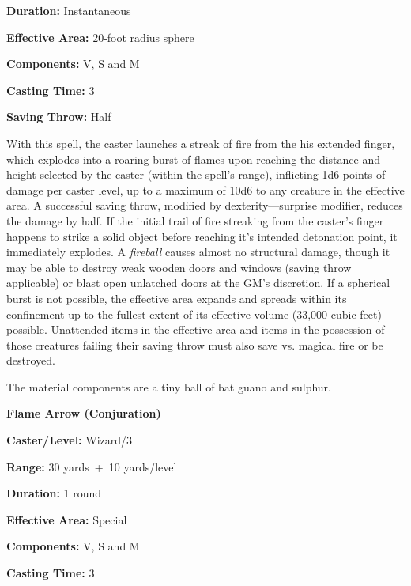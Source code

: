 \begin{multicols}{2}
\begin{minipage}{\columnwidth}
\noindent \textbf{Duration:} Instantaneous

\noindent \textbf{Effective Area:} 20-foot radius sphere

\noindent \textbf{Components:} V, S and M

\noindent \textbf{Casting Time:} 3

\noindent \textbf{Saving Throw:} Half

\end{minipage}

With this spell, the caster launches a streak of fire from the his extended finger, which explodes into a roaring burst of flames upon reaching the distance and height selected by the caster (within the spell's range), inflicting 1d6 points of damage per caster level, up to a maximum of 10d6 to any creature in the effective area.  A successful saving throw, modified by dexterity---surprise modifier, reduces the damage by half.  If the initial trail of fire streaking from the caster's finger happens to strike a solid object before reaching it's intended detonation point, it immediately explodes.  A \textit{fireball} causes almost no structural damage, though it may be able to destroy weak wooden doors and windows (saving throw applicable) or blast open unlatched doors at the GM's discretion.  If a spherical burst is not possible, the effective area expands and spreads within its confinement up to the fullest extent of its effective volume (33,000 cubic feet) possible.  Unattended items in the effective area and items in the possession of those creatures failing their saving throw must also save vs. magical fire or be destroyed. 

The material components are a tiny ball of bat guano and sulphur.

\vspace{1em}

\noindent
\begin{minipage}{\columnwidth}

\noindent \textbf{Flame Arrow (Conjuration)}

\noindent \textbf{Caster/Level:} Wizard/3

\noindent \textbf{Range:} 30 yards~+~10 yards/level

\noindent \textbf{Duration:} 1 round

\noindent \textbf{Effective Area:} Special

\noindent \textbf{Components:} V, S and M

\noindent \textbf{Casting Time:} 3


\end{minipage}
\end{multicols}
